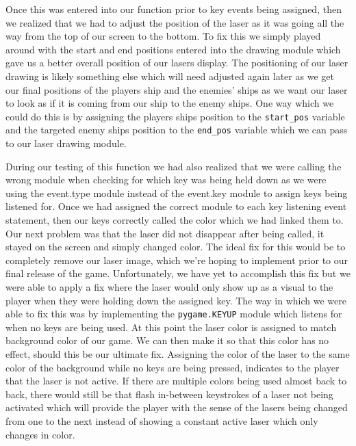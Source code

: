 \inputminted[baselinestretch=1]{python}{../code/lazer_strike_keydown.py}

Once this was entered
into our function prior to key events being assigned, then we
realized that we had to adjust the position of the laser as it was
going all the way from the top of our screen to the bottom. To fix
this we simply played around with the start and end positions
entered into the drawing module which gave us a better overall
position of our lasers display. The positioning of our laser drawing
is likely something else which will need adjusted again later as we
get our final positions of the players ship and the enemies’ ships
as we want our laser to look as if it is coming from our ship to the
enemy ships.  One way which we could do this is by assigning the
players ships position to the \texttt{start_pos}
variable and the targeted enemy ships position to the
\texttt{end_pos} variable which we can pass to our laser
drawing module.

During our testing of this function we had also realized that we
were calling the wrong module when checking for which key was being
held down as we were using the event.type module instead of the
event.key module to assign keys being listened for. Once we had
assigned the correct module to each key listening event statement,
then our keys correctly called the color which we had linked them
to. Our next problem was that the laser did not disappear after
being called, it stayed on the screen and simply changed color. The
ideal fix for this would be to completely remove our laser image,
which we’re hoping to implement prior to our final release of the
game. Unfortunately, we have yet to accomplish this fix but we were
able to apply a fix where the laser would only show up as a visual
to the player when they were holding down the assigned key. The way
in which we were able to fix this was by implementing the
\texttt{pygame.KEYUP} module which listens for when no
keys are being used.  At this point the laser color is assigned to
match background color of our game. We can then make it so that this
color has no effect, should this be our ultimate fix. Assigning the
color of the laser to the same color of the background while no keys
are being pressed, indicates to the player that the laser is not
active. If there are multiple colors being used almost back to back,
there would still be that flash in-between keystrokes of a laser not
being activated which will provide the player with the sense of the
lasers being changed from one to the next instead of showing a
constant active laser which only changes in color.

